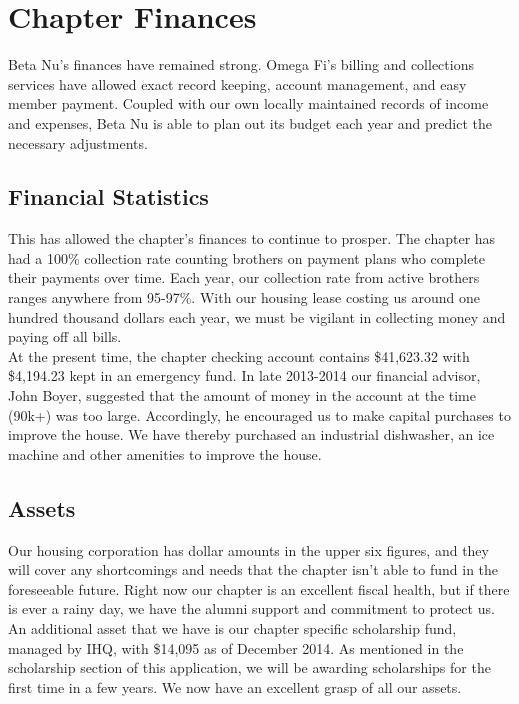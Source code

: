 \chapter{Chapter Finances}

  Beta Nu's finances have remained strong. Omega Fi's billing and collections services have allowed exact record keeping, account management, and easy member payment. Coupled with our own locally maintained records of income and expenses, Beta Nu is able to plan out its budget each year and predict the necessary adjustments.

  \section*{Financial Statistics}
    This has allowed the chapter's finances to continue to prosper. The chapter has had a 100\% collection rate counting brothers on payment plans who complete their payments over time. Each year, our collection rate from active brothers ranges anywhere from 95-97\%. With our housing lease costing us around one hundred thousand dollars each year, we must be vigilant in collecting money and paying off all bills. \\

    At the present time, the chapter checking account contains \$41,623.32 with \$4,194.23 kept in an emergency fund. In late 2013-2014 our financial advisor, John Boyer, suggested that the amount of money in the account at the time (90k+) was too large. Accordingly, he encouraged us to make capital purchases to improve the house. We have thereby purchased an industrial dishwasher, an ice machine and other amenities to improve the house.
    
  \section*{Assets}
    Our housing corporation has dollar amounts in the upper six figures, and they will cover any shortcomings and needs that the chapter isn't able to fund in the foreseeable future. Right now our chapter is an excellent fiscal health, but if there is ever a rainy day, we have the alumni support and commitment to protect us. An additional asset that we have is our chapter specific scholarship fund, managed by IHQ, with \$14,095 as of December 2014. As mentioned in the scholarship section of this application, we will be awarding scholarships for the first time in a few years. We now have an excellent grasp of all our assets.
    
